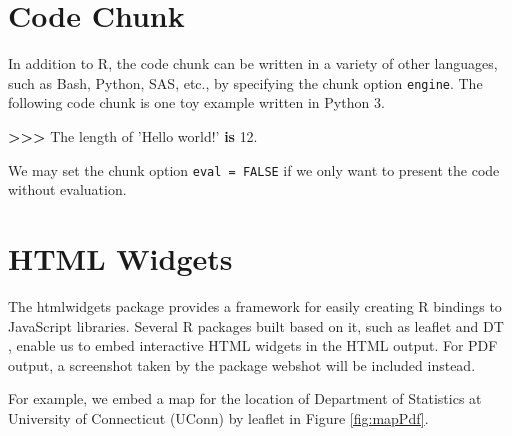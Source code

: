 \documentclass[11pt,letterpaper,]{article}
\newenvironment{Shaded}{\begin{snugshade}}{\end{snugshade}}
\newcommand{\BuiltInTok}[1]{#1}
\newcommand{\FloatTok}[1]{\textcolor[rgb]{0.00,0.00,0.81}{#1}}
\newcommand{\KeywordTok}[1]{\textcolor[rgb]{0.13,0.29,0.53}{\textbf{#1}}}
\newcommand{\NormalTok}[1]{#1}
\newcommand{\OperatorTok}[1]{\textcolor[rgb]{0.81,0.36,0.00}{\textbf{#1}}}
\newcommand{\SpecialCharTok}[1]{\textcolor[rgb]{0.00,0.00,0.00}{#1}}
\newcommand{\StringTok}[1]{\textcolor[rgb]{0.31,0.60,0.02}{#1}}
\newcommand{\pkg}[1]{{\normalfont\fontseries{b}\selectfont #1}}
\let\proglang=\textsf
\theoremstyle{definition}
\theoremstyle{definition}
\theoremstyle{definition}
\theoremstyle{remark}
\begin{document}
\hypertarget{sec:code}{%
\section{Code Chunk}\label{sec:code}}

In addition to \proglang{R}, the code chunk can be written in a variety
of other languages, such as \proglang{Bash}, \proglang{Python},
\proglang{SAS}, etc., by specifying the chunk option \texttt{engine}.
The following code chunk is one toy example written in
\proglang{Python 3}.

\begin{Shaded}
\end{Shaded}

\begin{Shaded}
\begin{Highlighting}[]
\OperatorTok{>>>}\NormalTok{  The length of }\StringTok{'Hello world!'} \KeywordTok{is} \FloatTok{12.}
\end{Highlighting}
\end{Shaded}

We may set the chunk option \texttt{eval\ =\ FALSE} if we only want to
present the code without evaluation.

\hypertarget{sec:widgets}{%
\section{HTML Widgets}\label{sec:widgets}}

The \pkg{htmlwidgets} package \citep{vaidyanathan2016htmlwidgets}
provides a framework for easily creating \proglang{R} bindings to
\proglang{JavaScript} libraries. Several \proglang{R} packages built
based on it, such as \pkg{leaflet} \citep{cheng2016leaflet} and \pkg{DT}
\citep{xie2016dt}, enable us to embed interactive HTML widgets in the
HTML output. For PDF output, a screenshot taken by the package
\pkg{webshot} \citep{chang2016webshot} will be included instead.

For example, we embed a map for the location of Department of Statistics
at University of Connecticut (UConn) by \pkg{leaflet} in Figure
\ref{fig:mapPdf}.
\end{document}
